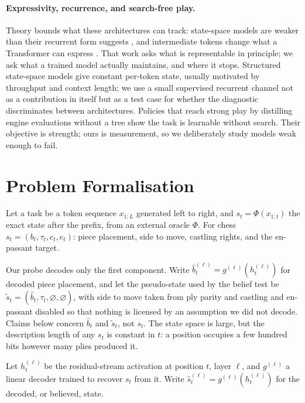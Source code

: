 \documentclass[manuscript, screen, review]{jair}
\theoremstyle{remark}
\begin{document}
\paragraph{Expressivity, recurrence, and search-free play.}
Theory bounds what these architectures can track: state-space models are weaker
than their recurrent form suggests \citep{merrill2024illusion}, and intermediate
tokens change what a Transformer can express \citep{merrill2024expressive}. That
work asks what is representable in principle; we ask what a trained model
actually maintains, and where it stops. Structured state-space models
\citep{gu2022efficiently,gu2024mamba} give constant per-token state, usually
motivated by throughput and context length; we use a small supervised recurrent
channel not as a contribution in itself but as a test case for whether the
diagnostic discriminates between architectures. Policies that reach strong play
by distilling engine evaluations without a tree \citep{ruoss2024amortized} show
the task is learnable without search. Their objective is strength; ours is
measurement, so we deliberately study models weak enough to fail.

\section{Problem Formalisation}
\label{sec:formal}

Let a task be a token sequence $x_{1:L}$ generated left to right, and
$s_t = \Phi(x_{1:t})$ the exact state after the prefix, from an external oracle
$\Phi$. For chess $s_t = (b_t, \tau_t, c_t, e_t)$: piece placement, side to move,
castling rights, and the en-passant target.

Our probe decodes only the first component. Write
$\hat{b}_t^{(\ell)} = g^{(\ell)}(h_t^{(\ell)})$ for decoded piece placement, and
let the pseudo-state used by the belief test be
$\tilde{s}_t = (\hat{b}_t, \tau_t, \varnothing, \varnothing)$, with side to move
taken from ply parity and castling and en-passant disabled so that nothing is
licensed by an assumption we did not decode. Claims below concern
$\hat{b}_t$ and $\tilde{s}_t$, not $s_t$. The state space is large, but the description length of any
$s_t$ is constant in $t$: a position occupies a few hundred bits however many
plies produced it.

Let $h_t^{(\ell)}$ be the residual-stream activation at position $t$, layer
$\ell$, and $g^{(\ell)}$ a linear decoder trained to recover $s_t$ from it. Write
$\hat{s}_t^{(\ell)} = g^{(\ell)}(h_t^{(\ell)})$ for the decoded, or believed,
state.
\end{document}
